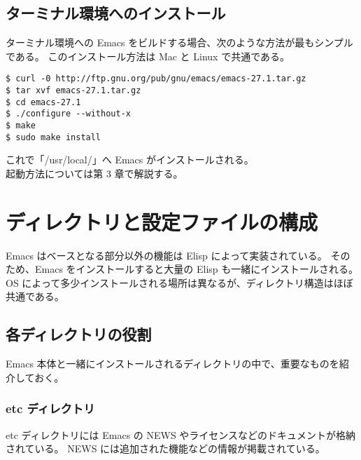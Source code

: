 \subsection{ターミナル環境へのインストール}
ターミナル環境への Emacs をビルドする場合、次のような方法が最もシンプルである。
このインストール方法は Mac と Linux で共通である。\enlargethispage{0.50zw}
\begin{mdframed}[roundcorner=0.50zw,leftmargin=3.00zw,rightmargin=3.00zw,skipabove=0.40zw,skipbelow=0.40zw,innertopmargin=4.00pt,innerbottommargin=4.00pt,innerleftmargin=5.00pt,innerrightmargin=5.00pt,linecolor=gray!090,linewidth=0.50pt,backgroundcolor=gray!90]\color{gray!10}
\begin{verbatim}
$ curl -0 http://ftp.gnu.org/pub/gnu/emacs/emacs-27.1.tar.gz
$ tar xvf emacs-27.1.tar.gz
$ cd emacs-27.1
$ ./configure --without-x
$ make
$ sudo make install
\end{verbatim}
\end{mdframed}
これで「/usr/local/」へ Emacs がインストールされる。\\

起動方法については第 3 章で解説する。
\section{ディレクトリと設定ファイルの構成}
Emacs はベースとなる部分以外の機能は Elisp によって実装されている。
そのため、Emacs をインストールすると大量の Elisp も一緒にインストールされる。
OS によって多少インストールされる場所は異なるが、ディレクトリ構造はほぼ共通である。
\subsection{各ディレクトリの役割}
Emacs 本体と一緒にインストールされるディレクトリの中で、重要なものを紹介しておく。
\subsubsection{etc ディレクトリ}
etc ディレクトリには Emacs の NEWS やライセンスなどのドキュメントが格納されている。
NEWS には追加された機能などの情報が掲載されている。
